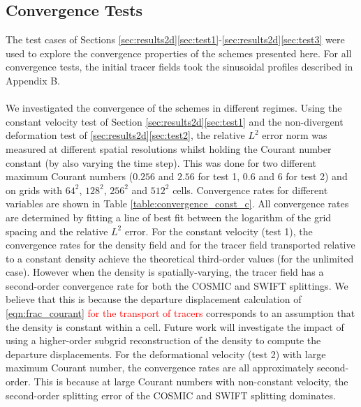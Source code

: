 \documentclass{ametsocV6.1}
\newcommand{\change}[1]{\textcolor{red}{#1}}
\begin{document}
\subsection{Convergence Tests} \label{sec:convergence}
The test cases of Sections \ref{sec:results2d}\ref{sec:test1}-\ref{sec:results2d}\ref{sec:test3} were used to explore the convergence properties of the schemes presented here.
For all convergence tests, the initial tracer fields took the sinusoidal profiles described in Appendix B. \\
\\
We investigated the convergence of the schemes in different regimes.
Using the constant velocity test of Section \ref{sec:results2d}\ref{sec:test1} and the non-divergent deformation test of \ref{sec:results2d}\ref{sec:test2}, the relative $L^2$ error norm was measured at different spatial resolutions whilst holding the Courant number constant (by also varying the time step).
This was done for two different maximum Courant numbers ($0.256$ and $2.56$ for test 1, $0.6$ and $6$ for test 2) and on grids with $64^2$, $128^2$, $256^2$ and $512^2$ cells.
Convergence rates for different variables are shown in Table \ref{table:convergence_const_c}.
All convergence rates are determined by fitting a line of best fit between the logarithm of the grid spacing and the relative $L^2$ error.
For the constant velocity (test 1), the convergence rates for the density field and for the tracer field transported relative to a constant density achieve the theoretical third-order values (for the unlimited case).
However when the density is spatially-varying, the tracer field has a second-order convergence rate for both the COSMIC and SWIFT splittings.
We believe that this is because the departure displacement calculation of \eqref{eqn:frac_courant} \change{for the transport of tracers} corresponds to an assumption that the density is constant within a cell.
Future work will investigate the impact of using a higher-order subgrid reconstruction of the density to compute the departure displacements.
For the deformational velocity (test 2) with large maximum Courant number, the convergence rates are all approximately second-order. This is because at large Courant numbers with non-constant velocity, the second-order splitting error of the COSMIC and SWIFT splitting dominates. 
\\
\end{document}

